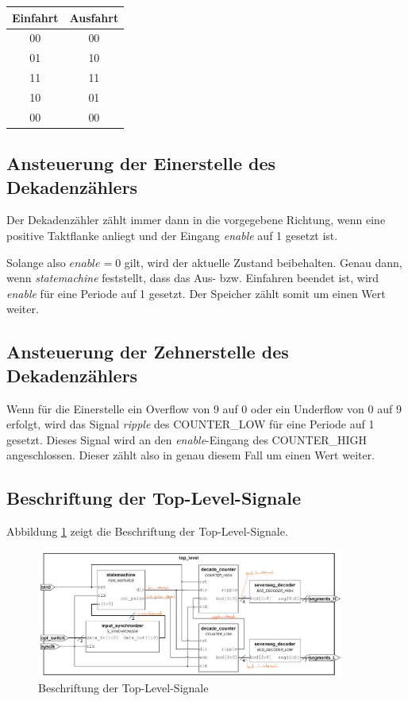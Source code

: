 \documentclass[
    paper=a4,
    parskip=half,
]{scrartcl}
\begin{document}
        \begin{tabular}{cc}\toprule
            Einfahrt    &   Ausfahrt\\\midrule
            00          &   00\\
            01          &   10\\
            11          &   11\\
            10          &   01\\
            00          &   00\\\bottomrule
        \end{tabular}

    \subsection{Ansteuerung der Einerstelle des Dekadenzählers}
        Der Dekadenzähler zählt immer dann in die vorgegebene Richtung, wenn eine positive Taktflanke anliegt und der Eingang \textit{enable} auf 1 gesetzt ist. 
        
        Solange also $enable=0$ gilt, wird der aktuelle Zustand beibehalten. Genau dann, wenn \textit{statemachine} feststellt, dass das Aus- bzw. Einfahren beendet ist, wird \textit{enable} für eine Periode auf 1 gesetzt. Der Speicher zählt somit um einen Wert weiter.
        
    \subsection{Ansteuerung der Zehnerstelle des Dekadenzählers}
        Wenn für die Einerstelle ein Overflow von 9 auf 0 oder ein Underflow von 0 auf 9 erfolgt, wird das Signal \textit{ripple} des COUNTER\_LOW für eine Periode auf 1 gesetzt. Dieses Signal wird an den \textit{enable}-Eingang des COUNTER\_HIGH angeschlossen. Dieser zählt also in genau diesem Fall um einen Wert weiter. 

    \subsection{Beschriftung der Top-Level-Signale}
        Abbildung \ref{fig:1} zeigt die Beschriftung der Top-Level-Signale.

    \begin{figure}[hb]
        \centering
        \includegraphics[width=0.9\textwidth]{top_level.png}
        \caption{Beschriftung der Top-Level-Signale}
        \label{fig:1}
    \end{figure}
\end{document}
